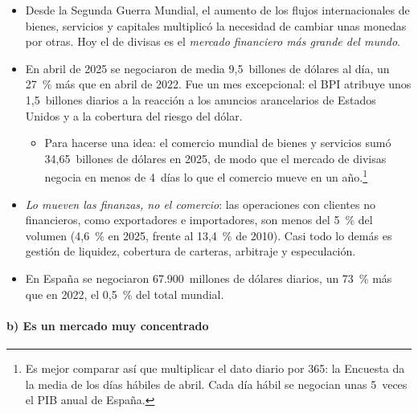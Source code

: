 \documentclass[11pt]{article}
\begin{document}
\begin{itemize}
\item Desde la Segunda Guerra Mundial, el aumento de los flujos internacionales de bienes, servicios y capitales multiplicó la necesidad de cambiar unas monedas por otras. Hoy el de divisas es el \emph{mercado financiero más grande del mundo}.
\item En abril de 2025 se negociaron de media 9,5~billones de dólares al día, un 27~\% más que en abril de 2022\nocite{BIS2026TrienalDatos}. Fue un mes excepcional: el BPI atribuye unos 1,5~billones diarios a la reacción a los anuncios arancelarios de Estados Unidos y a la cobertura del riesgo del dólar\nocite{HuangKrohnSushko2025FX}.
  \begin{itemize}
  \item Para hacerse una idea: el comercio mundial de bienes y servicios sumó 34,65~billones de dólares en 2025\nocite{OMC2026GTOS}, de modo que el mercado de divisas negocia en menos de 4~días lo que el comercio mueve en un año.\footnote{Es mejor comparar así que multiplicar el dato diario por 365: la Encuesta da la media de los días hábiles de abril. Cada día hábil se negocian unas 5~veces el PIB anual de España\nocite{BIS2026TrienalDatos,FMI2026WEO}.}
  \end{itemize}
\item \emph{Lo mueven las finanzas, no el comercio}: las operaciones con clientes no financieros, como exportadores e importadores, son menos del 5~\% del volumen (4,6~\% en 2025, frente al 13,4~\% de 2010)\nocite{BIS2026TrienalDatos}. Casi todo lo demás es gestión de liquidez, cobertura de carteras, arbitraje y especulación.
\item En España se negociaron 67.900~millones de dólares diarios, un 73~\% más que en 2022, el 0,5~\% del total mundial\nocite{BdE2025Encuesta}.
\end{itemize}

\paragraph{b) Es un mercado muy concentrado}
\end{document}
